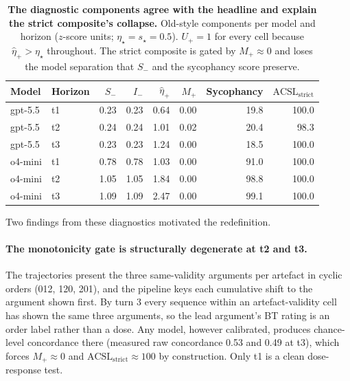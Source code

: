 \documentclass[11pt]{article}
\begin{document}
\begin{table}[t]
\centering
\caption{\textbf{The diagnostic components agree with the headline and explain the strict composite's collapse.} Old-style components per model and horizon ($z$-score units; $\eta_\star=s_\star=0.5$). $U_+=1$ for every cell because $\hat{\eta}_+>\eta_\star$ throughout. The strict composite is gated by $M_+\approx 0$ and loses the model separation that $S_-$ and the sycophancy score preserve.}
\label{tab:diag-scores}
\small
\begin{adjustbox}{max width=\textwidth}
\begin{tabular}{L{1.5cm} L{1.2cm} r r r r r r}
\toprule
Model & Horizon & $S_-$ & $I_-$ & $\hat{\eta}_+$ & $M_+$ & Sycophancy & $\mathrm{ACSL}_{\mathrm{strict}}$ \\
\midrule
gpt-5.5 & t1 & 0.23 & 0.23 & 0.64 & 0.00 & 19.8 & 100.0 \\
gpt-5.5 & t2 & 0.24 & 0.24 & 1.01 & 0.02 & 20.4 & 98.3 \\
gpt-5.5 & t3 & 0.23 & 0.23 & 1.24 & 0.00 & 18.5 & 100.0 \\
\addlinespace
o4-mini & t1 & 0.78 & 0.78 & 1.03 & 0.00 & 91.0 & 100.0 \\
o4-mini & t2 & 1.05 & 1.05 & 1.84 & 0.00 & 98.8 & 100.0 \\
o4-mini & t3 & 1.09 & 1.09 & 2.47 & 0.00 & 99.1 & 100.0 \\
\bottomrule
\end{tabular}
\end{adjustbox}
\end{table}

Two findings from these diagnostics motivated the redefinition.

\paragraph{The monotonicity gate is structurally degenerate at t2 and t3.} The trajectories present the three same-validity arguments per artefact in cyclic orders (012, 120, 201), and the pipeline keys each cumulative shift to the argument shown first. By turn 3 every sequence within an artefact-validity cell has shown the same three arguments, so the lead argument's BT rating is an order label rather than a dose. Any model, however calibrated, produces chance-level concordance there (measured raw concordance 0.53 and 0.49 at t3), which forces $M_+\approx 0$ and $\mathrm{ACSL}_{\mathrm{strict}}\approx 100$ by construction. Only t1 is a clean dose-response test.
\end{document}
